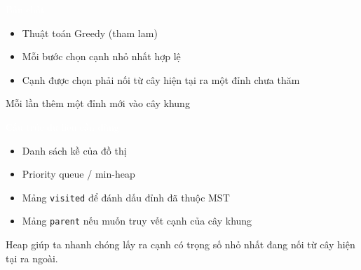 \documentclass{beamer}
\newcommand{\hlblue}[1]{\textcolor{myblue}{#1}}
\newcommand{\hlgreen}[1]{\textcolor{mygreen}{#1}}
\newcommand{\hlwhite}[1]{\textcolor{white}{#1}}
\begin{document}

\begin{frame}{\hlwhite{Bản chất}}
\begin{itemize}
\item Thuật toán \hlblue{Greedy (tham lam)}
\item Mỗi bước chọn cạnh nhỏ nhất hợp lệ
\item Cạnh được chọn phải nối từ cây hiện tại ra một đỉnh chưa thăm
\end{itemize}

\begin{tcolorbox}
\centering
\hlgreen{Mỗi lần thêm một đỉnh mới vào cây khung}
\end{tcolorbox}
\end{frame}


\begin{frame}{\hlwhite{Cấu trúc dữ liệu cần dùng}}
\begin{itemize}
\item Danh sách kề của đồ thị
\item \hlblue{Priority queue / min-heap}
\item Mảng \texttt{visited} để đánh dấu đỉnh đã thuộc MST
\item Mảng \texttt{parent} nếu muốn truy vết cạnh của cây khung
\end{itemize}

\begin{tcolorbox}[title=\textbf{\hlwhite{Vai trò của heap}}]
Heap giúp ta nhanh chóng lấy ra cạnh có trọng số nhỏ nhất đang nối từ cây hiện tại ra ngoài.
\end{tcolorbox}
\end{frame}

\end{document}
